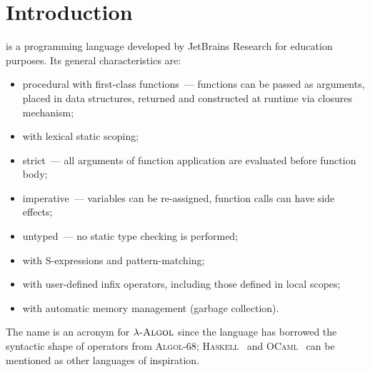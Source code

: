 \chapter{Introduction}

\lama is a programming language developed by JetBrains Research for education purposes. Its general characteristics are:

\begin{itemize}
\item procedural with first-class functions~--- functions can be passed as arguments, placed in data structures,
  returned and constructed at runtime via closures mechanism;
\item with lexical static scoping;
\item strict~--- all arguments of function application are evaluated before function body;
\item imperative~--- variables can be re-assigned, function calls can have side effects;
\item untyped~--- no static type checking is performed;
\item with S-expressions and pattern-matching;
\item with user-defined infix operators, including those defined in local scopes;
\item with automatic memory management (garbage collection).
\end{itemize}

The name \lama is an acronym for $\lambda\textsc{-Algol}$ since the language has borrowed the syntactic shape of
operators from \textsc{Algol-68}; \textsc{Haskell}~\cite{haskell} and \textsc{OCaml}~\cite{ocaml} can be
mentioned as other languages of inspiration.

%
%
%
